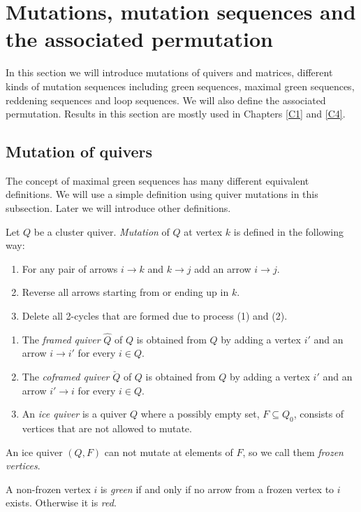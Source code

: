 \section{Mutations, mutation sequences and the associated permutation}
\indent In this section we will introduce mutations of quivers and matrices, different kinds of mutation sequences including green sequences, maximal green sequences, reddening sequences and loop sequences. We will also define the associated permutation. Results in this section are mostly used in Chapters \ref{C1} and \ref{C4}.\\
\subsection{Mutation of quivers}
\indent The concept of maximal green sequences has many different equivalent definitions. We will use a simple definition using quiver mutations in this subsection. Later we will introduce other definitions.\\
\begin{definition}
Let $Q$ be a cluster quiver. \textit{Mutation} of $Q$ at vertex $k$ is defined in the following way:
\begin{enumerate}
\item For any pair of arrows $i\to k$ and $k\to j$ add an arrow $i\to j$.
\item Reverse all arrows starting from or ending up in $k$.
\item Delete all 2-cycles that are formed due to process (1) and (2).
\end{enumerate}
\end{definition}
\begin{definition}
\begin{enumerate}
\item The \textit{framed quiver} $\hat{Q}$ of $Q$ is obtained from $Q$ by adding a vertex $i'$ and an arrow $i\rightarrow i'$ for every $i\in Q$.
\item The \textit{coframed quiver} $\breve{Q}$ of $Q$ is obtained from $Q$ by adding a vertex $i'$ and an arrow $i'\rightarrow i$ for every $i\in Q$.
\item An \textit{ice quiver} is a quiver $Q$ where a possibly empty set, $F\subseteq Q_0$, consists of vertices that are not allowed to mutate.
\end{enumerate}
\end{definition}
\indent An ice quiver $(Q,F)$ can not mutate at elements of $F$, so we call them \textit{frozen vertices}.
\begin{definition}
A non-frozen vertex $i$ is \textit{green} if and only if no arrow from a frozen vertex to $i$ exists. Otherwise it is \textit{red}.\cite{Kel11}
\end{definition}
